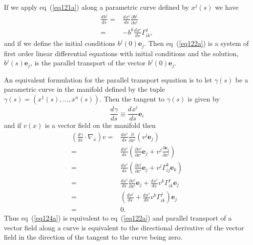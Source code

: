 \documentclass[12pt]{report}
\newcommand{\bm}[1]{\boldsymbol{#1}}
\newcommand{\bfrac}[2]{\displaystyle\frac{#1}{#2}}
\newcommand{\lp}{\left (}
\newcommand{\rp}{\right )}
\newcommand{\pdiff}[2]{\bfrac{\partial {#1}}{\partial {#2}}}
\newcommand{\f}[2]{{#1}\lp {#2} \rp}
\newcommand{\paren}[1]{\lp {#1} \rp}
\newcommand{\deriv}[3]{\bfrac{d^{#3}#1}{d{#2}^{#3}}}
\newcommand{\be}{\begin{equation}}
\newcommand{\ee}{\end{equation}}
\newcommand{\eb}{\bm{e}}
\begin{document}
If we apply eq~(\ref{eq121a}) along a parametric curve defined by $\f{x^{j}}{s}$ we have
\begin{align}
    \deriv{b^{j}}{s}{} =& \deriv{x^{i}}{s}{}\pdiff{b^{j}}{x^{i}} \nonumber \\
                       =& -b^{k}\deriv{x^{i}}{s}{}\Gamma_{ik}^{j}, \label{eq122a}
\end{align}
and if we define the initial conditions $\f{b^{j}}{0}\eb_{j}$.  Then eq~(\ref{eq122a}) is a system of first order
linear differential equations with initial conditions and the solution, $\f{b^{j}}{s}\eb_{j}$, is the parallel transport of the
vector $\f{b^{j}}{0}\eb_{j}$.

An equivalent formulation for the parallel transport equation is to let $\f{\gamma}{s}$ be a parametric curve in the manifold
defined by the tuple $\f{\gamma}{s} = \paren{\f{x^{1}}{s},\dots,\f{x^{n}}{s}}$.  Then the tangent to $\f{\gamma}{s}$ is given by
\be
    \deriv{\gamma}{s}{} \equiv \deriv{x^{i}}{s}{}\eb_{i}
\ee
and if $\f{v}{x}$ is a vector field on the manifold then
\begin{align}
    \paren{\deriv{\gamma}{s}{}\cdot\nabla_{x}}v =& \deriv{x^{i}}{s}{}\pdiff{}{x^{i}}\paren{v^{j}\eb_{j}} \nonumber \\
         =&\deriv{x^{i}}{s}{}\paren{\pdiff{v^{j}}{x^{i}}\eb_{j}+v^{j}\pdiff{\eb_{j}}{x^{i}}} \nonumber \\
         =&\deriv{x^{i}}{s}{}\paren{\pdiff{v^{j}}{x^{i}}\eb_{j}+v^{j}\Gamma^{k}_{ij}\eb_{k}} \nonumber \\
         =&\deriv{x^{i}}{s}{}\pdiff{v^{j}}{x^{i}}\eb_{j}+\deriv{x^{i}}{s}{}v^{k}\Gamma^{j}_{ik}\eb_{j} \nonumber \\
         =&\paren{\deriv{v^{j}}{s}{}+\deriv{x^{i}}{s}{}v^{k}\Gamma^{j}_{ik}}\eb_{j} \nonumber \\
         =& 0. \label{eq124a}
\end{align}
Thus eq~(\ref{eq124a}) is equivalent to eq~(\ref{eq122a}) and parallel transport of a vector field along a curve is
equivalent to the directional derivative of the vector field in the direction of the tangent to the curve being zero.
\end{document}
